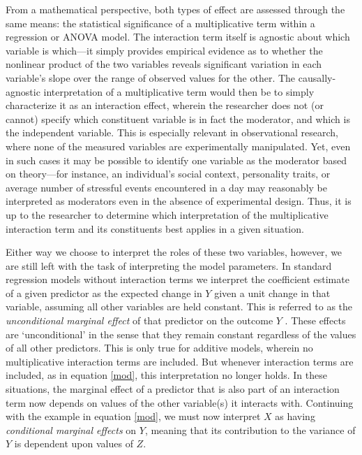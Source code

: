 From a mathematical perspective, both types of effect are assessed through the same means: the statistical significance of a multiplicative term within a regression or ANOVA model. The interaction term itself is agnostic about which variable is which---it simply provides empirical evidence as to whether the nonlinear product of the two variables reveals significant variation in each variable's slope over the range of observed values for the other. The causally-agnostic interpretation of a multiplicative term would then be to simply characterize it as an interaction effect, wherein the researcher does not (or cannot) specify which constituent variable is in fact the moderator, and which is the independent variable. This is especially relevant in observational research, where none of the measured variables are experimentally manipulated. Yet, even in such cases it may be possible to identify one variable as the moderator based on theory---for instance, an individual's social context, personality traits, or average number of stressful events encountered in a day may reasonably be interpreted as moderators even in the absence of experimental design. Thus, it is up to the researcher to determine which interpretation of the multiplicative interaction term and its constituents best applies in a given situation.

Either way we choose to interpret the roles of these two variables, however, we are still left with the task of interpreting the model parameters. In standard regression models without interaction terms we interpret the coefficient estimate of a given predictor as the expected change in $Y$ given a unit change in that variable, assuming all other variables are held constant. This is referred to as the \textit{unconditional marginal effect} of that predictor on the outcome $Y$ \cite{berry2016bias,brambor2006understanding,braumoeller2004hypothesis}. These effects are `unconditional' in the sense that they remain constant regardless of the values of all other predictors. This is only true for additive models, wherein no multiplicative interaction terms are included. But whenever interaction terms are included, as in equation \ref{mod}, this interpretation no longer holds. In these situations, the marginal effect of a predictor that is also part of an interaction term now depends on values of the other variable(s) it interacts with. Continuing with the example in equation \ref{mod}, we must now interpret $X$ as having \textit{conditional marginal effects} on $Y$, meaning that its contribution to the variance of $Y$ is dependent upon values of $Z$.

